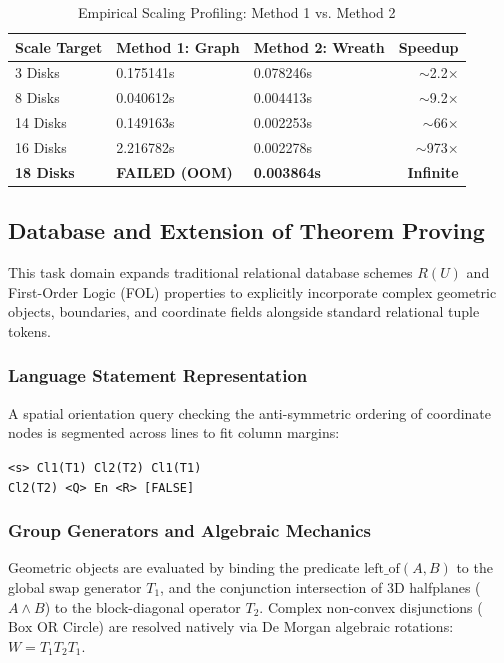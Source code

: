 \documentclass[twocolumn]{article}
\begin{document}
\begin{table}[h]
\small
\caption{Empirical Scaling Profiling: Method 1 vs. Method 2}
\label{tab:toh_benchmarks}
\centering
\begin{tabularx}{\columnwidth}{lXXr}
\toprule
\textbf{Scale Target} & \textbf{Method 1: Graph} & \textbf{Method 2: Wreath} & \textbf{Speedup} \\
\midrule
3 Disks  & 0.175141s & 0.078246s & $\sim$2.2$\times$ \\
8 Disks  & 0.040612s & 0.004413s & $\sim$9.2$\times$ \\
14 Disks & 0.149163s & 0.002253s & $\sim$66$\times$ \\
16 Disks & 2.216782s & 0.002278s & $\sim$973$\times$ \\
\textbf{18 Disks} & \textbf{FAILED (OOM)} & \textbf{0.003864s} & \textbf{Infinite} \\
\bottomrule
\end{tabularx}
\end{table}

\subsection{Database and Extension of Theorem Proving}
This task domain expands traditional relational database schemes $R(U)$ and First-Order Logic (FOL) properties to explicitly incorporate complex geometric objects, boundaries, and coordinate fields alongside standard relational tuple tokens.

\subsubsection{Language Statement Representation}
A spatial orientation query checking the anti-symmetric ordering of coordinate nodes is segmented across lines to fit column margins:
\begin{center}
    \texttt{<s> Cl1(T1) Cl2(T2) Cl1(T1)}\\
    \texttt{Cl2(T2) <Q> En <R> [FALSE]}
\end{center}

\subsubsection{Group Generators and Algebraic Mechanics}
Geometric objects are evaluated by binding the predicate $\text{left\_of}(A, B)$ to the global swap generator $T_1$, and the conjunction intersection of 3D halfplanes ($A \land B$) to the block-diagonal operator $T_2$. Complex non-convex disjunctions ($\text{Box OR Circle}$) are resolved natively via De Morgan algebraic rotations: $W = T_1 T_2 T_1$.
\end{document}
